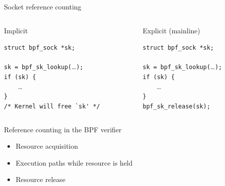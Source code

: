 \documentclass[black,white]{beamer}
\begin{document}
    \begin{frame}[fragile]{Socket reference counting}
        \begin{columns}[c]
            \hspace{0.02\textwidth}
            \begin{column}{0.46\textwidth}
            \begin{center}
            Implicit \bigskip
            \end{center}
            \verb+struct bpf_sock *sk;+\\
            ~\\
            \verb+sk = bpf_sk_lookup(+\ldots\verb+);+\\
            \verb+if (sk) {+\\
            ~~~~\ldots\\
            \verb+}+\\
            \verb+/* Kernel will free `sk' */+\\
            \end{column}
            \hspace{0.02\textwidth}
            \vrule{}
            \hspace{0.02\textwidth}
            \begin{column}{0.46\textwidth}
            \begin{center}
            Explicit (mainline) \bigskip
            \end{center}
            \verb+struct bpf_sock *sk;+\\
            ~\\
            \verb+sk = bpf_sk_lookup(+\ldots\verb+);+\\
            \verb+if (sk) {+\\
            ~~~~\ldots\\
            \verb+}+\\
            \verb+bpf_sk_release(sk);+\\
            \end{column}
            \hspace{0.02\textwidth}
        \end{columns}
    \end{frame}

    \begin{frame}{Reference counting in the BPF verifier}
        \begin{itemize}
            \item Resource acquisition \smallskip
            \item Execution paths while resource is held \smallskip
            \item Resource release \smallskip
        \end{itemize}
    \end{frame}
\end{document}
